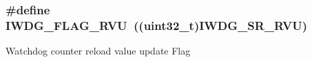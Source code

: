 \subsubsection[{\texorpdfstring{I\+W\+D\+G\+\_\+\+F\+L\+A\+G\+\_\+\+R\+VU}{IWDG_FLAG_RVU}}]{\setlength{\rightskip}{0pt plus 5cm}\#define I\+W\+D\+G\+\_\+\+F\+L\+A\+G\+\_\+\+R\+VU~((uint32\+\_\+t){\bf I\+W\+D\+G\+\_\+\+S\+R\+\_\+\+R\+VU})}\hypertarget{group___i_w_d_g___flag__definition_ga3731bf2711c234ffe5b405fb6634ebca}{}\label{group___i_w_d_g___flag__definition_ga3731bf2711c234ffe5b405fb6634ebca}
Watchdog counter reload value update Flag 